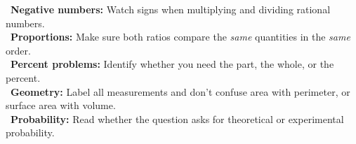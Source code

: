 {\vspace{2mm}

\begin{tcolorbox}[
    enhanced,
    colback=funYellowLight,
    colframe=funYellowDark!45,
    arc=10pt, boxrule=1pt,
    left=5mm, right=5mm, top=3mm, bottom=3mm,
    title={\small\textcolor{white}{\faExclamationTriangle~Grade 7 Terrain Warnings}},
    colbacktitle=funYellowDark!60,
    fonttitle=\bfseries\sffamily,
]
    \small
    \textcolor{funYellowDark}{\faExclamationTriangle}~\textbf{Negative numbers:} Watch signs when multiplying and dividing rational numbers.\\[2pt]
    \textcolor{funYellowDark}{\faExclamationTriangle}~\textbf{Proportions:} Make sure both ratios compare the \textit{same} quantities in the \textit{same} order.\\[2pt]
    \textcolor{funYellowDark}{\faExclamationTriangle}~\textbf{Percent problems:} Identify whether you need the part, the whole, or the percent.\\[2pt]
    \textcolor{funYellowDark}{\faExclamationTriangle}~\textbf{Geometry:} Label all measurements and don't confuse area with perimeter, or surface area with volume.\\[2pt]
    \textcolor{funYellowDark}{\faExclamationTriangle}~\textbf{Probability:} Read whether the question asks for theoretical or experimental probability.
\end{tcolorbox}

\vspace{2mm}

}
